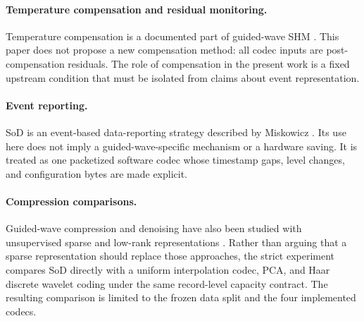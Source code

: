 \paragraph{Temperature compensation and residual monitoring.}
Temperature compensation is a documented part of guided-wave SHM
\cite{croxford2010}. This paper does not propose a new compensation method:
all codec inputs are post-compensation residuals. The role of compensation in
the present work is a fixed upstream condition that must be isolated from
claims about event representation.

\paragraph{Event reporting.}
SoD is an event-based data-reporting strategy described by Miskowicz
\cite{miskowicz2006}. Its use here does not imply a guided-wave-specific
mechanism or a hardware saving. It is treated as one packetized software
codec whose timestamp gaps, level changes, and configuration bytes are made
explicit.

\paragraph{Compression comparisons.}
Guided-wave compression and denoising have also been studied with
unsupervised sparse and low-rank representations \cite{yang2023compression}. Rather than
arguing that a sparse representation should replace those approaches, the
strict experiment compares SoD directly with a uniform interpolation codec,
PCA, and Haar discrete wavelet coding under the same record-level capacity
contract. The resulting comparison is limited to the frozen data split and
the four implemented codecs.
